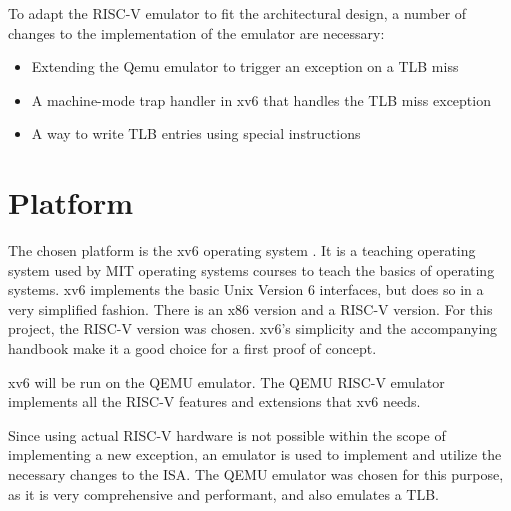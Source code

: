 To adapt the RISC-V emulator to fit the architectural design, a number of changes to the implementation of the emulator are necessary:

\begin{itemize}
    \item Extending the Qemu emulator to trigger an exception on a TLB miss
    \item A machine-mode trap handler in xv6 that handles the TLB miss exception
    \item A way to write TLB entries using special instructions
\end{itemize}


\section{Platform}
The chosen platform is the xv6 operating system \cite{xv6source}. It is a teaching operating system
used by MIT operating systems courses to teach the basics of operating systems.
xv6 implements the basic Unix Version 6 interfaces, but does so in a very simplified fashion.
There is an x86 version and a RISC-V version. For this project, the RISC-V version was chosen.
xv6's simplicity and the accompanying handbook \cite{cox2011xv6} make it a good choice for a first
proof of concept.

xv6 will be run on the QEMU \cite{QEMUSource2024} emulator. The QEMU RISC-V emulator implements
all the RISC-V features and extensions that xv6 needs.

Since using actual RISC-V hardware is not possible within the scope of implementing a new exception, an emulator is used to implement and utilize the necessary changes to the ISA. The QEMU emulator was chosen for this purpose, as it is very comprehensive and performant, and also emulates a TLB.




